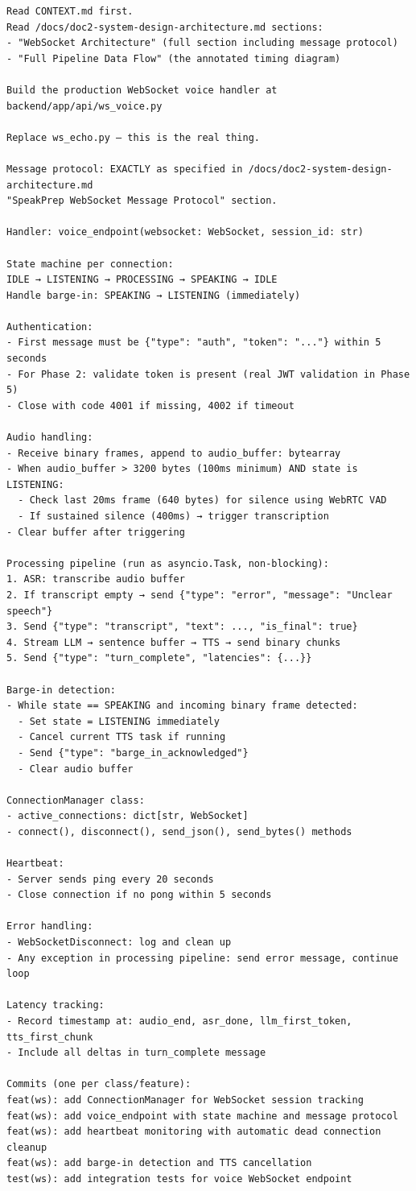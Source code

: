 \documentclass[
  11pt,
]{article}
\begin{document}
\begin{lstlisting}
Read CONTEXT.md first.
Read /docs/doc2-system-design-architecture.md sections:
- "WebSocket Architecture" (full section including message protocol)
- "Full Pipeline Data Flow" (the annotated timing diagram)

Build the production WebSocket voice handler at backend/app/api/ws_voice.py

Replace ws_echo.py — this is the real thing.

Message protocol: EXACTLY as specified in /docs/doc2-system-design-architecture.md
"SpeakPrep WebSocket Message Protocol" section.

Handler: voice_endpoint(websocket: WebSocket, session_id: str)

State machine per connection:
IDLE → LISTENING → PROCESSING → SPEAKING → IDLE
Handle barge-in: SPEAKING → LISTENING (immediately)

Authentication:
- First message must be {"type": "auth", "token": "..."} within 5 seconds
- For Phase 2: validate token is present (real JWT validation in Phase 5)
- Close with code 4001 if missing, 4002 if timeout

Audio handling:
- Receive binary frames, append to audio_buffer: bytearray
- When audio_buffer > 3200 bytes (100ms minimum) AND state is LISTENING:
  - Check last 20ms frame (640 bytes) for silence using WebRTC VAD
  - If sustained silence (400ms) → trigger transcription
- Clear buffer after triggering

Processing pipeline (run as asyncio.Task, non-blocking):
1. ASR: transcribe audio buffer
2. If transcript empty → send {"type": "error", "message": "Unclear speech"}
3. Send {"type": "transcript", "text": ..., "is_final": true}
4. Stream LLM → sentence buffer → TTS → send binary chunks
5. Send {"type": "turn_complete", "latencies": {...}}

Barge-in detection:
- While state == SPEAKING and incoming binary frame detected:
  - Set state = LISTENING immediately
  - Cancel current TTS task if running
  - Send {"type": "barge_in_acknowledged"}
  - Clear audio buffer

ConnectionManager class:
- active_connections: dict[str, WebSocket]
- connect(), disconnect(), send_json(), send_bytes() methods

Heartbeat:
- Server sends ping every 20 seconds
- Close connection if no pong within 5 seconds

Error handling:
- WebSocketDisconnect: log and clean up
- Any exception in processing pipeline: send error message, continue loop

Latency tracking:
- Record timestamp at: audio_end, asr_done, llm_first_token, tts_first_chunk
- Include all deltas in turn_complete message

Commits (one per class/feature):
feat(ws): add ConnectionManager for WebSocket session tracking
feat(ws): add voice_endpoint with state machine and message protocol
feat(ws): add heartbeat monitoring with automatic dead connection cleanup
feat(ws): add barge-in detection and TTS cancellation
test(ws): add integration tests for voice WebSocket endpoint
\end{lstlisting}
\end{document}
